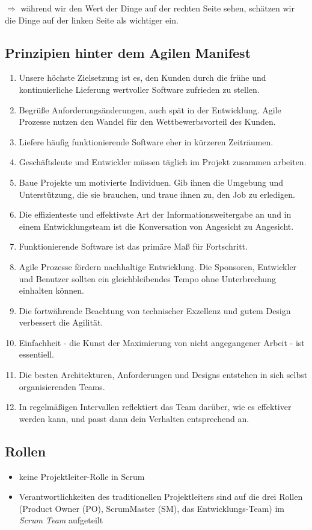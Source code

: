 $\Rightarrow$ während wir den Wert der Dinge auf der rechten Seite sehen, schätzen wir die
Dinge auf der linken Seite als wichtiger ein.


\subsection{Prinzipien hinter dem Agilen Manifest}
\begin{enumerate}
  \item Unsere höchste Zielsetzung ist es, den Kunden durch die frühe und kontinuierliche
    Lieferung wertvoller Software zufrieden zu stellen.
  \item Begrüße Anforderungsänderungen, auch spät in der Entwicklung. Agile Prozesse nutzen den Wandel für den Wettbewerbsvorteil des Kunden.
  \item Liefere häufig funktionierende Software eher in kürzeren Zeiträumen.
  \item Geschäftsleute und Entwickler müssen täglich im Projekt zusammen arbeiten.
  \item Baue Projekte um motivierte Individuen. Gib ihnen die Umgebung und
    Unterstützung, die sie brauchen, und traue ihnen zu, den Job zu erledigen.
  \item Die effizienteste und effektivste Art der Informationsweitergabe an und in einem Entwicklungsteam ist die Konversation von Angesicht zu Angesicht.
  \item Funktionierende Software ist das primäre Maß für Fortschritt.
  \item Agile Prozesse fördern nachhaltige Entwicklung. Die Sponsoren, Entwickler und
    Benutzer sollten ein gleichbleibendes Tempo ohne Unterbrechung einhalten
    können.
  \item Die fortwährende Beachtung von technischer Exzellenz und gutem Design
    verbessert die Agilität.
  \item Einfachheit - die Kunst der Maximierung von nicht angegangener Arbeit - ist essentiell.
  \item Die besten Architekturen, Anforderungen und Designs entstehen in sich selbst
    organisierenden Teams.
  \item In regelmäßigen Intervallen reflektiert das Team darüber, wie es effektiver werden kann,
    und passt dann dein Verhalten entsprechend an.
\end{enumerate}


\subsection{Rollen}
\begin{itemize}
  \item keine Projektleiter-Rolle in Scrum
  \item Verantwortlichkeiten des traditionellen Projektleiters sind auf die drei Rollen (Product
    Owner (PO), ScrumMaster (SM), das Entwicklungs-Team) im \textit{Scrum Team} aufgeteilt
\end{itemize}


